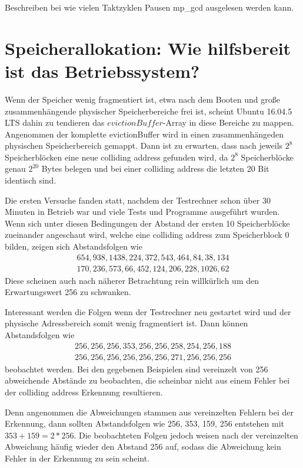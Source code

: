 Beschreiben bei wie vielen Taktzyklen Pausen mp_gcd ausgelesen werden kann.

\section{Speicherallokation: Wie hilfsbereit ist das Betriebssystem?}

Wenn der Speicher wenig fragmentiert ist, etwa nach dem Booten und große zusammenhängende physischer Speicherbereiche frei ist, scheint Ubuntu 16.04.5 LTS dahin zu tendieren das $evictionBuffer$-Array in diese Bereiche zu mappen.
Angenommen der komplette evictionBuffer wird in einen zusammenhängeden physischen Speicherbereich gemappt. Dann ist zu erwarten, dass nach jeweils $2^8$ Speicherblöcken eine neue colliding address gefunden wird, da $2^8$ Speicherblöcke genau $2^20$ Bytes belegen und bei einer colliding address die letzten 20 Bit identisch sind.

Die ersten Versuche fanden statt, nachdem der Testrechner schon über 30 Minuten in Betrieb war und viele Tests und Programme ausgeführt wurden.
Wenn sich unter diesen Bedingungen der Abstand der ersten 10 Speicherblöcke zueinander angeschaut wird, welche eine colliding address zum Speicherblock 0 bilden, zeigen sich Abstandsfolgen wie 
\begin{align*} 
654, 938, 1438, 224, 372, 543, 464, 84, 38, 134\\
170, 236, 573, 66, 452, 124, 206, 228, 1026, 62
\end{align*}
Diese scheinen auch nach näherer Betrachtung rein willkürlich um den Erwartungswert 256 zu schwanken.

Interessant werden die Folgen wenn der Testrechner neu gestartet wird und der physische Adressbereich somit wenig fragmentiert ist.
Dann können Abstandsfolgen wie 
\begin{align*} 
256, 256, 256, 353, 256, 256, 258, 254, 256, 188\\
256, 256, 256, 256, 256, 256, 271, 256, 256, 256
\end{align*}
beobachtet werden.
Bei den gegebenen Beispielen sind vereinzelt von 256 abweichende Abstände zu beobachten, die scheinbar nicht aus einem Fehler bei der colliding address Erkennung resultieren.

Denn angenommen die Abweichungen stammen aus vereinzelten Fehlern bei der Erkennung, dann sollten Abstandsfolgen wie 256, 353, 159, 256 entstehen mit $353+159=2*256$.
Die beobachteten Folgen jedoch weisen nach der vereinzelten Abweichung häufig wieder den Abstand 256 auf, sodass die Abweichung kein Fehler in der Erkennung zu sein scheint.

